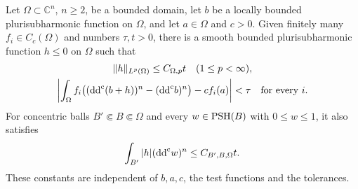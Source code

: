 \begin{proposition}\label{prop:local-one-atom-addition}
Let $\Omega\subset\mathbb C^n$, $n\geq2$, be a bounded domain, let $b$ be a locally bounded plurisubharmonic function on $\Omega$, and let $a\in\Omega$ and $c>0$. Given finitely many $f_i\in C_c(\Omega)$ and numbers $\tau,t>0$, there is a smooth bounded plurisubharmonic function $h\leq0$ on $\Omega$ such that
\[
 \begin{gathered}
 \|h\|_{L^p(\Omega)}\leq C_{\Omega,p}t\quad(1\leq p<\infty),\\
 \left|\int_\Omega f_i\bigl((\mathrm{dd}^{\mathrm{c}}(b+h))^n-(\mathrm{dd}^{\mathrm{c}} b)^n\bigr)
                         -cf_i(a)\right|<\tau\quad\text{for every }i.
 \end{gathered}
\]
For concentric balls $B'\Subset B\Subset\Omega$ and every $w\in\mathrm{PSH}(B)$ with $0\leq w\leq1$, it also satisfies
\[
 \int_{B'}|h|(\mathrm{dd}^{\mathrm{c}} w)^n\leq C_{B',B,\Omega}t.
\]
These constants are independent of $b,a,c$, the test functions and the tolerances.
\end{proposition}
